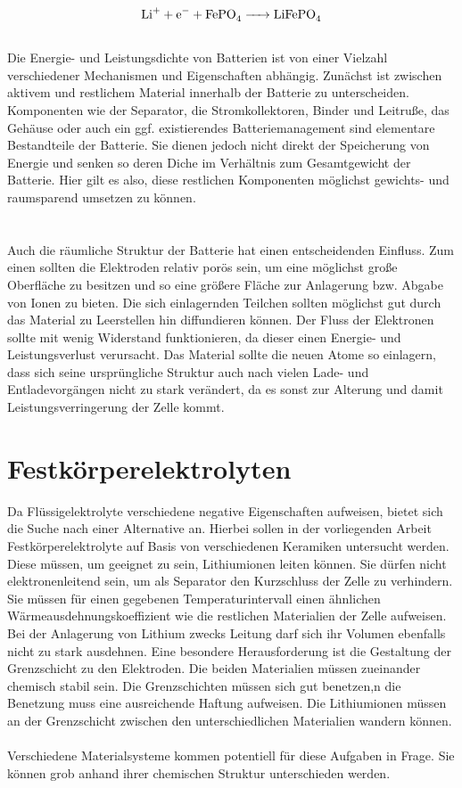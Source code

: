 \documentclass[a4paper, 11pt, headsepline,footsepline,twoside,abstract]{scrbook}
\begin{document}
\begin{equation}
	\ce{Li+ + e- + FePO4 -> LiFePO4}
\end{equation}\\
Die Energie-  und Leistungsdichte von Batterien ist von einer Vielzahl verschiedener Mechanismen und Eigenschaften abhängig. Zunächst ist zwischen aktivem und restlichem Material innerhalb der Batterie zu unterscheiden. Komponenten wie der Separator, die Stromkollektoren, Binder und Leitruße, das Gehäuse oder auch ein ggf. existierendes Batteriemanagement sind elementare Bestandteile der Batterie. Sie dienen jedoch nicht direkt der Speicherung von Energie und senken so deren Diche im Verhältnis zum Gesamtgewicht der Batterie. Hier gilt es also, diese restlichen Komponenten möglichst gewichts- und raumsparend umsetzen zu können.
\\\\
\\ %
Auch die räumliche Struktur der Batterie hat einen entscheidenden Einfluss. Zum einen sollten die Elektroden relativ porös sein, um eine möglichst große Oberfläche zu besitzen und so eine größere Fläche zur Anlagerung bzw. Abgabe von Ionen zu bieten. Die sich einlagernden Teilchen sollten möglichst gut durch das Material zu Leerstellen hin diffundieren können. Der Fluss der Elektronen sollte mit wenig Widerstand funktionieren, da dieser einen Energie- und Leistungsverlust verursacht. Das Material sollte die neuen Atome so einlagern, dass sich seine ursprüngliche Struktur auch nach vielen Lade- und Entladevorgängen nicht zu stark verändert, da es sonst zur Alterung und damit Leistungsverringerung der Zelle kommt.   
\section{Festkörperelektrolyten}
Da Flüssigelektrolyte verschiedene negative Eigenschaften aufweisen, bietet sich die Suche nach einer Alternative an. Hierbei sollen in der vorliegenden Arbeit Festkörperelektrolyte auf Basis von verschiedenen Keramiken untersucht werden. Diese müssen, um geeignet zu sein, Lithiumionen leiten können. Sie dürfen nicht elektronenleitend sein, um als Separator den Kurzschluss der Zelle zu verhindern. Sie müssen für einen gegebenen Temperaturintervall einen ähnlichen Wärmeausdehnungskoeffizient wie die restlichen Materialien der Zelle aufweisen. Bei der Anlagerung von Lithium zwecks Leitung darf sich ihr Volumen ebenfalls nicht zu stark ausdehnen. Eine besondere Herausforderung ist die Gestaltung der Grenzschicht zu den Elektroden. Die beiden Materialien müssen zueinander chemisch stabil sein. Die Grenzschichten müssen sich gut benetzen,n die Benetzung muss eine ausreichende Haftung aufweisen. Die Lithiumionen müssen an der Grenzschicht zwischen den unterschiedlichen Materialien wandern können.\\\\
Verschiedene Materialsysteme kommen potentiell für diese Aufgaben in Frage. Sie können grob anhand ihrer chemischen Struktur unterschieden werden.
\end{document}
